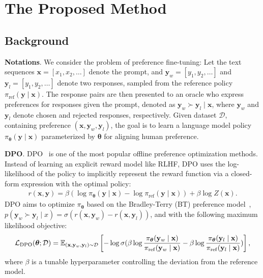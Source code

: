 \section{The Proposed Method}
\label{sec:method}
\subsection{Background}
\textbf{Notations}. We consider the problem of preference fine-tuning: 
Let the text sequences $\mathbf{x} =[ x_1, x_2, \ldots ]$ denote the prompt, and $\mathbf{y}_{w}=[ y_1, y_2, \ldots ]$ and $\mathbf{y}_{l}=[ y_1, y_2, \ldots ]$ denote two responses,  sampled from the reference policy $\pi_{\text{ref}}(\mathbf{y} \mid \mathbf{x})$. The response pairs are then presented to an oracle who express preferences for responses given the prompt, denoted as $\mathbf{y}_{w} \succ \mathbf{y}_{l} \mid \mathbf{x}$, where $\mathbf{y}_{w}$ and $\mathbf{y}_{l}$ denote chosen and rejected responses, respectively. Given dataset $\mathcal{D}$, containing preference $(\mathbf{x}, \mathbf{y}_{w}, \mathbf{y}_{l})$, the goal is to learn a language model policy $\pi_{\boldsymbol{\theta}}(\mathbf{y} \mid \mathbf{x})$ parameterized by $\boldsymbol{\theta}$ for aligning human preference. 

\textbf{DPO}. DPO~\citep{rafailov2024direct} is one of the most popular offline preference optimization methods. Instead of learning an explicit reward model like RLHF, DPO uses the log-likelihood of the policy to implicitly represent the reward function via a closed-form expression with the optimal policy:
\begin{align}
r(\mathbf{x}, \mathbf{y})=\beta\left(\log \pi_{\boldsymbol{\theta}}(\mathbf{y} \mid \mathbf{x})-\log \pi_{\mathrm{ref}}(\mathbf{y} \mid \mathbf{x})\right)+\beta \log Z(\mathbf{x}).
\end{align}
DPO aims to optimize $\pi_{\boldsymbol{\theta}}$ based on the Bradley-Terry (BT) preference model~\citep{bradley1952rank}, $p\left(\mathbf{y}_w \succ \mathbf{y}_l \mid x\right)=\sigma\left(r(\mathbf{x},\mathbf{y}_w)-r\left(\mathbf{x},\mathbf{y}_l\right)\right)$, and with the following maximum likelihood objective: 
\begingroup\makeatletter\def\f@size{9.5}\check@mathfonts\def\maketag@@@#1{\hbox{\m@th\normalfont\normalfont#1}}
\begin{align}
\mathcal{L}_{\rm{DPO}}({\boldsymbol{\theta}}; \mathcal{D})=\mathbb{E}_{(\mathbf{x}, \mathbf{y}_w, \mathbf{y}_l)\sim \mathcal{D}}\left[-\log \sigma(\beta \log \frac{\pi_{\boldsymbol{\theta}}(\mathbf{y}_w \mid \mathbf{x})}{\pi_{\mathrm{ref}}(\mathbf{y}_w \mid \mathbf{x})}-\beta \log \frac{\pi_{\boldsymbol{\theta}}(\mathbf{y}_l \mid \mathbf{x} )}{\pi_{\mathrm{ref}}(\mathbf{y}_l \mid \mathbf{x})})\right], \label{Eq:DPO}
\end{align}
\endgroup
where $\beta$ is a tunable hyperparameter controlling the deviation from the reference model.  

